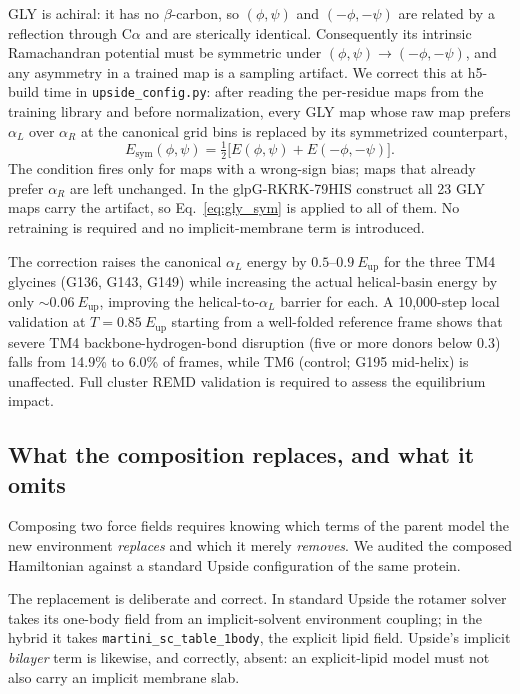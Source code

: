 \documentclass[journal=jctcce,manuscript=article,layout=twocolumn]{achemso}
\begin{document}
GLY is achiral: it has no $\beta$-carbon, so $(\phi,\psi)$ and
$(-\phi,-\psi)$ are related by a reflection through C$\alpha$ and are
sterically identical. Consequently its intrinsic Ramachandran potential must
be symmetric under $(\phi,\psi)\to(-\phi,-\psi)$, and any asymmetry in a
trained map is a sampling artifact. We correct this at h5-build time in
\texttt{upside\_config.py}: after reading the per-residue maps from the
training library and before normalization, every GLY map whose raw map
prefers $\alpha_L$ over $\alpha_R$ at the canonical grid bins is replaced by
its symmetrized counterpart,
\begin{equation}
  E_\mathrm{sym}(\phi,\psi)
  = \tfrac{1}{2}\bigl[E(\phi,\psi) + E(-\phi,-\psi)\bigr].
  \label{eq:gly_sym}
\end{equation}
The condition fires only for maps with a wrong-sign bias; maps that already
prefer $\alpha_R$ are left unchanged. In the glpG-RKRK-79HIS construct all
23 GLY maps carry the artifact, so Eq.~\ref{eq:gly_sym} is applied to all
of them. No retraining is required and no implicit-membrane term is
introduced.

The correction raises the canonical $\alpha_L$ energy by $0.5$--$0.9~E_\mathrm{up}$
for the three TM4 glycines (G136, G143, G149) while increasing the actual
helical-basin energy by only $\sim0.06~E_\mathrm{up}$, improving the
helical-to-$\alpha_L$ barrier for each. A 10{,}000-step local validation at
$T=0.85~E_\mathrm{up}$ starting from a well-folded reference frame shows that
severe TM4 backbone-hydrogen-bond disruption (five or more donors below $0.3$)
falls from 14.9\% to 6.0\% of frames, while TM6 (control; G195 mid-helix)
is unaffected. Full cluster REMD validation is required to assess the
equilibrium impact.

\subsection{What the composition replaces, and what it omits}
\label{sec:audit}

Composing two force fields requires knowing which terms of the parent model the
new environment \emph{replaces} and which it merely \emph{removes}. We audited the
composed Hamiltonian against a standard Upside configuration of the same protein.

The replacement is deliberate and correct. In standard Upside the rotamer solver
takes its one-body field from an implicit-solvent environment coupling; in the
hybrid it takes \texttt{martini\_sc\_table\_1body}, the explicit lipid field. Upside's
implicit \emph{bilayer} term is likewise, and correctly, absent: an explicit-lipid
model must not also carry an implicit membrane slab.
\end{document}
